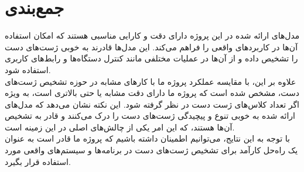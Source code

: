 
\section{جمع‌بندی}
مدل‌های ارائه شده در این پروژه دارای دقت و کارایی مناسبی هستند که امکان استفاده آن‌ها در کاربردهای واقعی را فراهم می‌کند. این مدل‌ها قادرند به خوبی ژست‌های دست را تشخیص داده و از آن‌ها در عملیات مختلفی مانند کنترل دستگاه‌ها و رابط‌های کاربری استفاده شود.
\\
علاوه بر این، با مقایسه عملکرد پروژه ما با کارهای مشابه در حوزه تشخیص ژست‌های دست، مشخص شده است که پروژه ما دارای دقت مشابه یا حتی بالاتری است، به ویژه اگر تعداد کلاس‌های ژست دست در نظر گرفته شود. این نکته نشان می‌دهد که مدل‌های ارائه شده به خوبی تنوع و پیچیدگی ژست‌های دست را درک می‌کنند و قادر به تشخیص آن‌ها هستند، که این امر یکی از چالش‌های اصلی در این زمینه است.
\\
با توجه به این نتایج، می‌توانیم اطمینان داشته باشیم که پروژه ما قادر است به عنوان یک راه‌حل کارآمد برای تشخیص ژست‌های دست در برنامه‌ها و سیستم‌های واقعی مورد استفاده قرار بگیرد.
